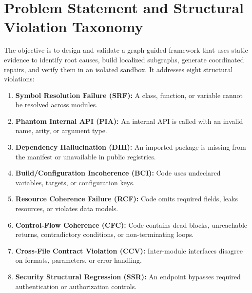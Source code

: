 \documentclass[10pt,a4paper]{article}
\begin{document}
\section{Problem Statement and Structural Violation Taxonomy}
The objective is to design and validate a graph-guided framework that uses static evidence to identify root causes, build localized subgraphs, generate coordinated repairs, and verify them in an isolated sandbox. It addresses eight structural violations:
\begin{enumerate}[leftmargin=1.4em]
  \item \textbf{Symbol Resolution Failure (SRF):} A class, function, or variable cannot be resolved across modules.
  \item \textbf{Phantom Internal API (PIA):} An internal API is called with an invalid name, arity, or argument type.
  \item \textbf{Dependency Hallucination (DHI):} An imported package is missing from the manifest or unavailable in public registries.
  \item \textbf{Build/Configuration Incoherence (BCI):} Code uses undeclared variables, targets, or configuration keys.
  \item \textbf{Resource Coherence Failure (RCF):} Code omits required fields, leaks resources, or violates data models.
  \item \textbf{Control-Flow Coherence (CFC):} Code contains dead blocks, unreachable returns, contradictory conditions, or non-terminating loops.
  \item \textbf{Cross-File Contract Violation (CCV):} Inter-module interfaces disagree on formats, parameters, or error handling.
  \item \textbf{Security Structural Regression (SSR):} An endpoint bypasses required authentication or authorization controls.
\end{enumerate}

\newpage

\fontsize{9.3}{11.2}\selectfont
\end{document}
